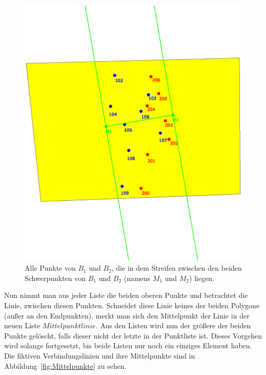 \begin{figure}
	\centering
	\includegraphics[scale=0.6]{RectDist.eps}
	\caption[Punkte mit einem rechtwinkeligen Abstand zur Schwerpunktlinie]{Alle Punkte von $B_1$ und $B_2$, die in dem Streifen zwischen den beiden Schwerpunkten von $B_1$ und $B_2$ (namens $M_1$ und $M_2$) liegen.}
	\label{fig:RectDist}		
\end{figure}


Nun nimmt man aus jeder Liste die beiden oberen Punkte und betrachtet die Linie, zwischen diesen Punkten. Schneidet diese Linie keines der beiden Polygone (außer an den Endpunkten), merkt man sich den Mittelpunkt der Linie in der neuen Liste  $Mittelpunktlinie$. Aus den Listen wird nun der größere der beiden Punkte gelöscht, falls dieser nicht der letzte in der Punktliste ist. Dieses Vorgehen wird solange fortgesetzt, bis beide Listen nur noch ein einziges Element haben. Die fiktiven Verbindungslinien und ihre Mittelpunkte sind in Abbildung~\vref{fig:Mittelpunkte} zu sehen.

